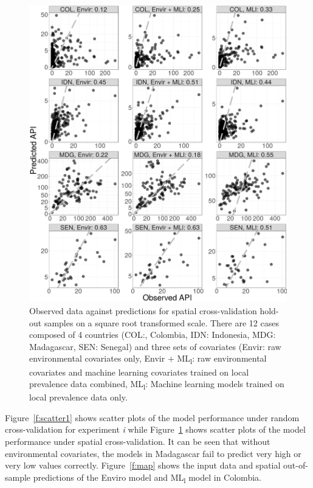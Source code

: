 \documentclass[review]{elsarticle}
\begin{document}
\begin{figure}
  \includegraphics[width=\textwidth]{figs/cv2_l_scatter.png}
\caption{
  Observed data against predictions for spatial cross-validation hold-out samples on a square root transformed scale.
  There are 12 cases composed of 4 countries (COL:, Colombia, IDN: Indonesia, MDG: Madagascar, SEN: Senegal) and three sets of covariates (Envir: raw environmental covariates only, Envir +  ML\textsubscript{l}: raw environmental covariates and machine learning covariates trained on local prevalence data combined, ML\textsubscript{l}: Machine learning models trained on local prevalence data only.
}
\label{f:scatter2}
\end{figure}

Figure~\ref{f:scatter1} shows scatter plots of the model performance under random cross-validation for experiment \emph{i} while Figure~\ref{f:scatter2} shows scatter plots of the model performance under spatial cross-validation.
It can be seen that without environmental covariates, the models in Madagascar fail to predict very high or very low values correctly.
Figure~\ref{f:map} shows the input data and spatial out-of-sample predictions of the Enviro model and ML\textsubscript{l} model in Colombia.
\end{document}
